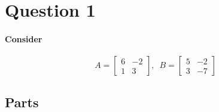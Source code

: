 \documentclass{article}
\begin{document}
    \section{Question 1}


        \paragraph{Consider} 
            $$A=\begin{bmatrix}6&-2\\1&3\end{bmatrix},\enspace B=\begin{bmatrix}5&-2\\3&-7\end{bmatrix}$$
        \subsection{Parts}
    
\end{document}
